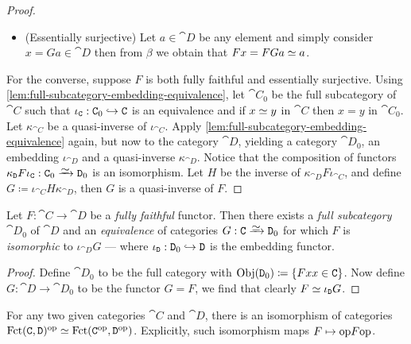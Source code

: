 \begin{proof}
\begin{itemize}
        \item (Essentially surjective) Let \(a \in \cat D\) be any element and simply
              consider \(x = G a \in \cat D\) then from \(\beta\) we obtain that
              \(Fx = F G a \simeq a\).
    \end{itemize}

    For the converse, suppose \(F\) is both fully faithful and essentially
    surjective. Using \cref{lem:full-subcategory-embedding-equivalence}, let
    \(\cat C_0\) be the full subcategory of \(\cat C\) such that
    \(\iota_{\texttt C}: \texttt C_0 \hookrightarrow \texttt C\) is an equivalence and if \(x \simeq y\)
    in \(\cat C\) then \(x = y\) in \(\cat C_0\). Let \(\kappa_{\cat C}\) be a
    quasi-inverse of \(\iota_{\cat C}\). Apply
    \cref{lem:full-subcategory-embedding-equivalence} again, but now to the category
    \(\cat D\), yielding a category \(\cat D_0\), an embedding \(\iota_{\cat D}\)
    and a quasi-inverse \(\kappa_{\cat D}\). Notice that the composition of functors
    \(\kappa_{\cat D} F \iota_{\cat C}: \cat C_0 \isoto \cat D_0\) is an
    isomorphism. Let \(H\) be the inverse of \(\kappa_{\cat D} F \iota_{\cat C}\),
    and define \(G \coloneq \iota_{\cat C} H \kappa_{\cat D}\), then \(G\) is a
    quasi-inverse of \(F\).
\end{proof}

\begin{corollary}
    \label{cor:fully-faithful-induces-equivalence-to-full-subcategory}
    Let \(F: \cat C \to \cat D\) be a \emph{fully faithful} functor. Then there
    exists a \emph{full subcategory} \(\cat D_0\) of \(\cat D\) and an
    \emph{equivalence} of categories \(G: \cat C \isoto \cat D_0\) for which \(F\)
    is \emph{isomorphic} to \(\iota_{\cat D} G\) --- where
    \(\iota_{\texttt D}: \texttt D_0 \hookrightarrow \texttt D\) is the embedding functor.
\end{corollary}

\begin{proof}
    Define \(\cat D_0\) to be the full category with
    \(\operatorname{Obj}(\texttt D_0) \coloneq \{F x \relax x \in \texttt C\}\). Now define
    \(G: \cat D \to \cat D_0\) to be the functor \(G = F\), we find that clearly
    \(F \simeq \iota_{\texttt D} G\).
\end{proof}

\begin{example}
    \label{exp:equivalence-category-functor-opposite}
    For any two given categories \(\cat C\) and \(\cat D\), there is an isomorphism
    of categories \(\operatorname{Fct}(\texttt C, \texttt D)^{\mathrm{op}} \simeq \operatorname{Fct}(\texttt C^{\mathrm{op}}, \texttt
    D^{\mathrm{op}})\). Explicitly, such isomorphism maps \(F \mapsto \mathrm{op} F \mathrm{op}\).
\end{example}

